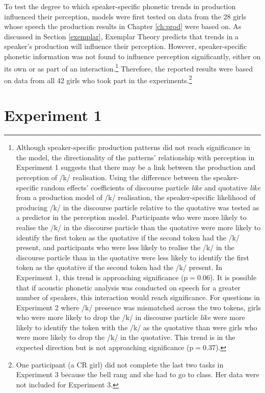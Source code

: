 To test the degree to which speaker-specific phonetic trends in production influenced their perception, models were first tested on data from the 28 girls whose speech the production results in Chapter \ref{ch:prod} were based on.  As discussed in Section \ref{exemplar}, Exemplar Theory predicts that trends in a speaker's production will influence their perception.  However, speaker-specific phonetic information was not found to influence perception significantly, either on its own or as part of an interaction.\footnote{Although speaker-specific production patterns did not reach significance in the model, the directionality of the patterns' relationship with perception in Experiment 1 suggests that there may be a link between the production and perception of /k/ realisation.  Using the difference between the speaker-specific random effects' coefficients of discourse particle \textit{like} and quotative \textit{like} from a production model of /k/ realisation, the speaker-specific likelihood of producing /k/ in the discourse particle relative to the quotative was tested as a predictor in the perception model.  Participants who were more likely to realise the /k/ in the discourse particle than the quotative were more likely to identify the first token as the quotative if the second token had the /k/ present, and participants who were less likely to realise the /k/ in the discourse particle than in the quotative were less likely to identify the first token as the quotative if the second token had the /k/ present. In Experiment 1, this trend is approaching significance (p$=$0.06).  It is possible that if acoustic phonetic analysis was conducted on speech for a greater number of speakers, this interaction would reach significance.  For questions in Experiment 2 where /k/ presence was mismatched across the two tokens, girls who were more likely to drop the /k/ in discourse particle \textit{like} were more likely to identify the token with the /k/ as the quotative than were girls who were more likely to drop the /k/ in the quotative.  This trend is in the expected direction but is not approaching significance (p$=$0.37).}  Therefore, the reported results were based on data from all 42 girls who took part in the experiments.\footnote{One participant (a CR girl) did not complete the last two tasks in Experiment 3 because the bell rang and she had to go to class.  Her data were not included for Experiment 3.} 


\section{Experiment 1}\label{exp1} 

